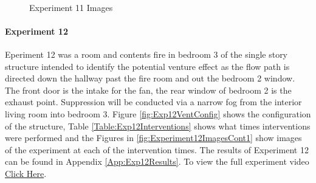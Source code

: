 \documentclass{article}
\begin{document}
\begin{figure}[H]
	\ContinuedFloat 
	\centering 
	 \ 
	 \ 
	\caption{Experiment 11 Images}
	\label{fig:Experiment11ImagesCont3} 
\end{figure}

\paragraph{Experiment 12}\mbox{}

Eperiment 12 was a room and contents fire in bedroom 3 of the single story structure intended to identify the potential venture effect as the flow path is directed down the hallway past the fire room and out the bedroom 2 window. The front door is the intake for the fan, the rear window of bedroom 2 is the exhaust point. Suppression will be conducted via a narrow fog from the interior living room into bedroom 3. Figure \ref{fig:Exp12VentConfig} shows the configuration of the structure, Table \ref{Table:Exp12Interventions} shows what times interventions were performed and the Figures in \ref{fig:Experiment12ImagesCont1} show images of the experiment at each of the intervention times. The results of Experiment 12 can be found in Appendix \ref{App:Exp12Results}. To view the full experiment video \href{https://youtu.be/4ROh9dXBXM0}{Click Here}.
\end{document}
